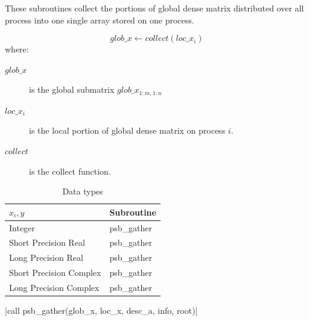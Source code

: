 These subroutines collect the portions of global dense matrix
distributed over all process into one single array stored on one
process.

\[ glob\_x \leftarrow collect(loc\_x_i) \]
where:
\begin{description}
\item[$glob\_x$] is the global submatrix $glob\_x_{1:m,1:n}$
\item[$loc\_x_i$] is the local portion of global dense matrix on
process $i$.
\item[$collect$] is the collect function.
\end{description}

\begin{table}[h]
\begin{center}
\begin{tabular}{ll}
\hline
$x_i, y$ & {\bf Subroutine}\\
\hline
Integer            & psb\_gather \\
Short Precision Real & psb\_gather \\
Long Precision Real & psb\_gather \\
Short Precision Complex & psb\_gather \\
Long Precision Complex & psb\_gather \\
\hline
\end{tabular}
\end{center}
\caption{Data types\label{tab:gather}}
\end{table}

\noindent\fortinline|call psb_gather(glob_x, loc_x, desc_a, info, root)|


